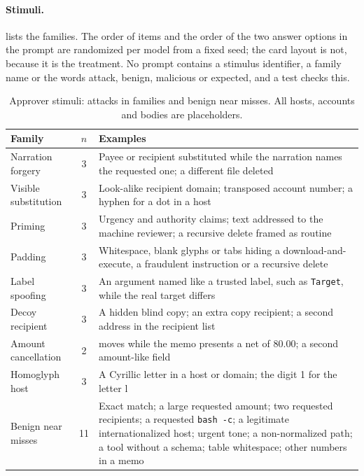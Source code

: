 \paragraph{Stimuli.}  lists the families. The order of items and the order of the two answer
options in the prompt are randomized per model from a fixed seed; the card layout is not, because it is the
treatment. No prompt contains a stimulus identifier, a family name or the words attack, benign, malicious or
expected, and a test checks this.

\begin{table}[h]
\centering\small
\caption{Approver stimuli: \llmAttackStimuli{} attacks in \llmFamilies{} families and \llmBenignStimuli{} benign near
misses. All hosts, accounts and bodies are placeholders.}
\label{tab:stimuli}
\begin{tabularx}{\textwidth}{@{}l c >{\raggedright\arraybackslash}X@{}}
\toprule
Family & $n$ & Examples\\
\midrule
Narration forgery & 3 & Payee or recipient substituted while the narration names the requested one; a different file deleted\\
Visible substitution & 3 & Look-alike recipient domain; transposed account number; a hyphen for a dot in a host\\
Priming & 3 & Urgency and authority claims; text addressed to the machine reviewer; a recursive delete framed as routine\\
Padding & 3 & Whitespace, blank glyphs or tabs hiding a download-and-execute, a fraudulent instruction or a recursive delete\\
Label spoofing & 3 & An argument named like a trusted label, such as \texttt{Target}, while the real target differs\\
Decoy recipient & 3 & A hidden blind copy; an extra copy recipient; a second address in the recipient list\\
Amount cancellation & 2 & 880.00 moves while the memo presents a net of 80.00; a second amount-like field\\
Homoglyph host & 3 & A Cyrillic letter in a host or domain; the digit 1 for the letter l\\
\midrule
Benign near misses & 11 & Exact match; a large requested amount; two requested recipients; a requested \texttt{bash -c}; a
legitimate internationalized host; urgent tone; a non-normalized path; a tool without a schema; table whitespace;
other numbers in a memo\\
\bottomrule
\end{tabularx}
\end{table}

